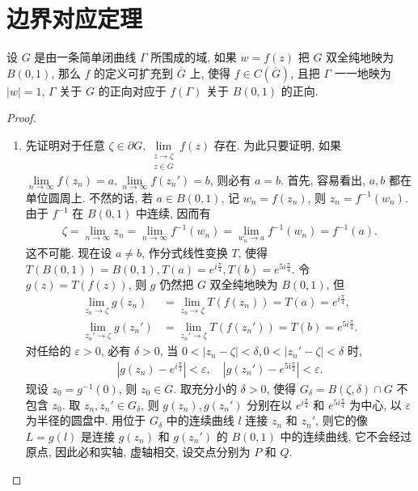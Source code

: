 \documentclass[../../main.tex]{subfiles}%
\begin{document}
\section{边界对应定理}

\begin{theorem}[边界对应定理]\label{theorem:边界对应定理}
设 \(G\) 是由一条简单闭曲线 \(\Gamma\) 所围成的域, 如果 \(w=f(z)\) 把 \(G\) 双全纯地映为 \(B(0,1)\), 那么 \(f\) 的定义可扩充到 \(\overline{G}\) 上, 使得 \(f \in C(\overline{G})\), 且把 \(\Gamma\) 一一地映为 \(|w|=1\), \(\Gamma\) 关于 \(G\) 的正向对应于 \(f(\Gamma)\) 关于 \(B(0,1)\) 的正向.
\end{theorem}
\begin{proof}
\begin{enumerate}[(1)]
\item 先证明对于任意 \(\zeta \in \partial G, \lim\limits_{\substack{z \to \zeta \\ z \in G}} f(z)\) 存在. 为此只要证明, 如果 \(\lim\limits_{n\to\infty} f(z_n)=a, \lim\limits_{n\to\infty} f(z_n')=b\), 则必有 \(a=b\).
首先, 容易看出, \(a,b\) 都在单位圆周上. 不然的话, 若 \(a \in B(0,1)\), 记 \(w_n = f(z_n)\), 则 \(z_n = f^{-1}(w_n)\). 由于 \(f^{-1}\) 在 \(B(0,1)\) 中连续, 因而有
\begin{align*}
\zeta = \lim\limits_{n\to\infty} z_n = \lim\limits_{n\to\infty} f^{-1}(w_n) = \lim\limits_{w_n \to a} f^{-1}(w_n) = f^{-1}(a).
\end{align*}
这不可能.
现在设 \(a \neq b\), 作分式线性变换 \(T\), 使得 \(T(B(0,1))=B(0,1), T(a)=e^{i\frac{\pi}{4}}, T(b)=e^{5i\frac{\pi}{4}}\). 令 \(g(z)=T(f(z))\), 则 \(g\) 仍然把 \(G\) 双全纯地映为 \(B(0,1)\), 但
\begin{align*}
\lim\limits_{z_n \to \zeta} g(z_n) &= \lim\limits_{z_n \to \zeta} T(f(z_n)) = T(a) = e^{i\frac{\pi}{4}}, \\
\lim\limits_{z_n' \to \zeta} g(z_n') &= \lim\limits_{z_n' \to \zeta} T(f(z_n')) = T(b) = e^{5i\frac{\pi}{4}}.
\end{align*}
对任给的 \(\varepsilon>0\), 必有 \(\delta>0\), 当 \(0<|z_n-\zeta|<\delta, 0<|z_n'-\zeta|<\delta\) 时,
\begin{align*}
|g(z_n)-e^{i\frac{\pi}{4}}|<\varepsilon, \quad |g(z_n')-e^{5\mathrm{i}\frac{\pi}{4}}|<\varepsilon.
\end{align*}
现设 \(z_0 = g^{-1}(0)\), 则 \(z_0 \in G\). 取充分小的 \(\delta>0\), 使得 \(G_\delta = B(\zeta,\delta) \cap G\) 不包含 \(z_0\). 取 \(z_n, z_n' \in G_\delta\), 则 \(g(z_n), g(z_n')\) 分别在以 \(e^{i\frac{\pi}{4}}\) 和 \(e^{5i\frac{\pi}{4}}\) 为中心, 以 \(\varepsilon\) 为半径的圆盘中. 用位于 \(G_\delta\) 中的连续曲线 \(l\) 连接 \(z_n\) 和 \(z_n'\), 则它的像 \(L=g(l)\) 是连接 \(g(z_n)\) 和 \(g(z_n')\) 的 \(B(0,1)\) 中的连续曲线, 它不会经过原点, 因此必和实轴, 虚轴相交, 设交点分别为 \(P\) 和 \(Q\).

\end{enumerate}
\end{proof}
\end{document}
